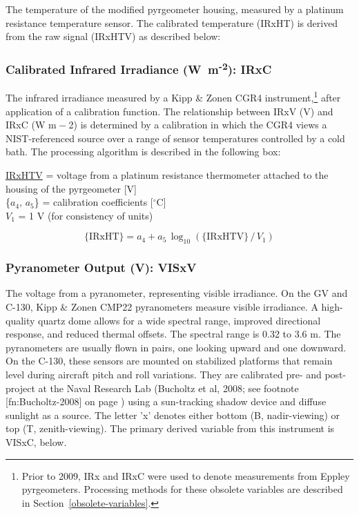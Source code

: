 \documentclass[
]{book}
\begin{document}
The temperature of the modified pyrgeometer housing, measured by a platinum resistance temperature sensor. The calibrated temperature (IRxHT) is derived from the raw signal (IRxHTV) as described below:

\hypertarget{irxc}{%
\subsubsection*{\texorpdfstring{Calibrated Infrared Irradiance (W~m\textsuperscript{-2}): IRxC}{Calibrated Infrared Irradiance (W~m-2): IRxC}}\label{irxc}}

The infrared irradiance measured by a Kipp \& Zonen CGR4 instrument,\footnote{Prior to 2009, IRx and IRxC were used to denote measurements from Eppley pyrgeometers. Processing methods for these obsolete variables are described in Section~\ref{obsolete-variables}.}
after application of a calibration function. The relationship between IRxV (V) and IRxC (W m{ − 2}) is determined by a calibration in which the CGR4 views a NIST-referenced source over a range of sensor temperatures controlled by a cold bath. The processing algorithm is described in the following box:

\protect\hyperlink{irxht}{IRxHTV} = voltage from a platinum resistance thermometer attached to the housing
of the pyrgeometer {[}V{]}\\
\{\(a_4,\,a_5\)\} = calibration coefficients {[}\(^\circ\)C{]}\\
\(V_1\) = 1 V (for consistency of units)

\begin{equation}
\mathrm{\{IRxHT\}} = a_4 + a_5\,\log_{10}(\mathrm{\{IRxHTV\}}\,/\,V_1)
\label{eq:IRxHTbox}
\end{equation}

\hypertarget{visxv}{%
\subsubsection*{Pyranometer Output (V): VISxV}\label{visxv}}

The voltage from a pyranometer, representing visible irradiance. On the GV and C-130, Kipp \& Zonen CMP22 pyranometers measure visible irradiance. A high-quality quartz dome allows for a wide spectral range, improved directional response, and reduced thermal offsets. The spectral range is 0.32 to 3.6 m. The pyranometers are usually flown in pairs, one looking upward and one downward. On the C-130, these sensors are mounted on stabilized platforms that remain level during aircraft pitch and roll variations. They are calibrated pre- and post-project at the Naval Research Lab (Bucholtz et al, 2008; see footnote {[}fn:Bucholtz-2008{]} on page ) using a sun-tracking shadow device and diffuse sunlight as a source. The letter 'x' denotes either bottom (B, nadir-viewing) or top (T, zenith-viewing). The primary derived variable from this instrument is VISxC, below.
\end{document}

